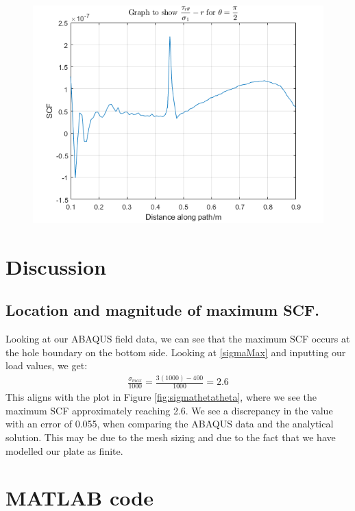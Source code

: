 \documentclass[11pt]{article}
\numberwithin{equation}{section}
\begin{document}
\begin{figure}[H]
    \begin{minipage}{.33\textwidth}
      \centering
      \includegraphics[width=\linewidth]{./img/diagram11.png}
      \label{fig:taurthetapi2}
    \end{minipage}
\end{figure}
\section{Discussion}
\subsection{Location and magnitude of maximum SCF.}
Looking at our ABAQUS field data, we can see that the maximum SCF occurs at the hole boundary on the bottom side. Looking at \ref{sigmaMax} and inputting our load values, we get:
\begin{gather}
    \frac{\sigma_{max}}{1000} = \frac{3(1000)-400}{1000} = 2.6 
\end{gather}
This aligns with the plot in Figure \ref{fig:sigmathetatheta}, where we see the maximum SCF approximately reaching 2.6. We see a discrepancy in the value with an error of 0.055, when comparing the ABAQUS data and the analytical solution. This may be due to the mesh sizing and due to the fact that we have modelled our plate as finite. 
\appendix
\section{MATLAB code}

\end{document}
